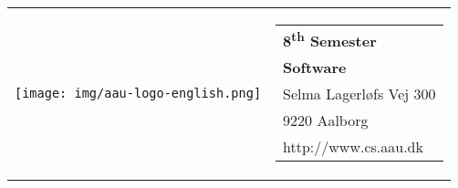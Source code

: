 \begin{titlepage}
    \setlength{\textwidth}{15cm}
    \noindent
    \begin{nopagebreak}
        {\samepage
            \begin{tabular}{lr}
                \parbox{0.40\textwidth}{\raisebox{11mm}
                    {\texttt{[image: img/aau-logo-english.png]}}
                } &
                \parbox{0.4\textwidth}{
                    \small
                    \begin{tabular}{l}
                        {\sf\small \textbf{8\textsuperscript{th} Semester}}\\
                        {\sf\small \textbf{Software}}\\
                        {\sf\small Selma Lagerløfs Vej 300 } \\
                        {\sf\small 9220 Aalborg} \\
                        {\sf\small http://www.cs.aau.dk}
                    \end{tabular}
                }
            \end{tabular}

}
\end{nopagebreak}
\end{titlepage}
